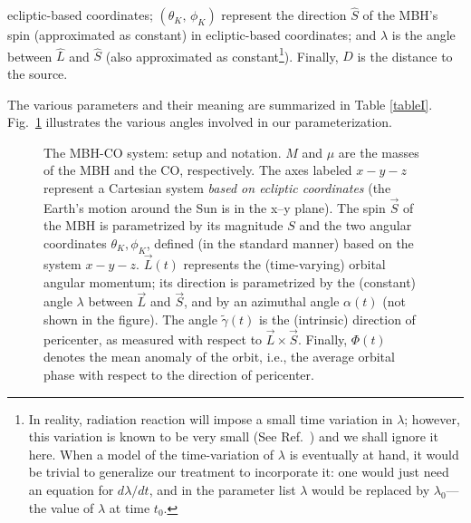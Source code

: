 \documentclass[11pt]{report}
\begin{document}
ecliptic-based coordinates; $(\theta_K,\,\phi_K)$ represent the direction
$\hat S$ of the MBH's spin (approximated as constant) in ecliptic-based
coordinates; and $\lambda$ is the angle between $\hat L$ and $\hat S$ (also
approximated as constant\footnote
{In reality, radiation reaction will impose a small time variation in
$\lambda$; however, this variation is known to be very small
(See Ref.\ \cite{scott1}) and we shall ignore
it here. When a model of the time-variation of $\lambda$ is eventually
at hand, it would be trivial to generalize our treatment to
incorporate it: one would just need an equation for $d\lambda/dt$,
and in the parameter list $\lambda$ would be replaced by
$\lambda_0$---the value of $\lambda$ at time $t_0$.}).
Finally, $D$ is the distance to the source.

The various parameters and their meaning are summarized in Table
\ref{tableI}. Fig.\ \ref{fig1} illustrates the various angles involved
in our parameterization.

\begin{figure}[htb]

\centerline{\epsfysize 6cm }
\caption{\protect\footnotesize
The MBH-CO system: setup and notation.
$M$ and $\mu$ are the masses of the MBH and the CO, respectively.
The axes labeled $x{-}y{-}z$ represent a Cartesian system {\em based on
ecliptic coordinates} (the Earth's motion around
the Sun is in the x--y plane). The spin $\vec S$ of the MBH is parametrized
by its magnitude $S$ and the two angular coordinates $\theta_K,\phi_K$,
defined (in the standard manner) based on the system $x{-}y{-}z$.
$\vec L(t)$ represents the (time-varying) orbital angular momentum;
its direction is parametrized by the (constant) angle $\lambda$ between
$\vec L$ and $\vec S$, and by an azimuthal angle $\alpha(t)$ (not
shown in the figure).
The angle $\tilde\gamma(t)$ is the (intrinsic) direction of pericenter,
as measured with respect to $\vec L\times\vec S$. Finally,
$\Phi(t)$ denotes the mean anomaly of the orbit, i.e., the average
orbital phase with respect to the direction of pericenter.}
\label{fig1}
\end{figure}
\end{document}
